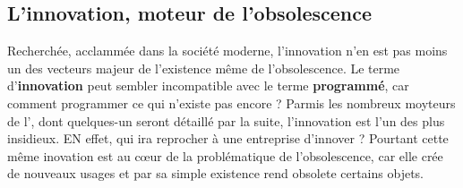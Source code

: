 \subsection{L'innovation, moteur de l'obsolescence}
Recherchée, acclammée dans la société moderne, l'innovation n'en est pas moins un des vecteurs majeur de l'existence même de l'obsolescence. Le terme d'\textbf{innovation} peut sembler incompatible avec le terme \textbf{programmé}, car comment programmer ce qui n'existe pas encore ?
\smallbreak
Parmis les nombreux moyteurs de l'\op, dont quelques-un seront détaillé par la suite, l'innovation est l'un des plus insidieux. EN effet, qui ira reprocher à une entreprise d'innover ? Pourtant cette même inovation est au cœur de la problématique de l'obsolescence, car elle crée de nouveaux usages et par sa simple existence rend obsolete certains objets. 
